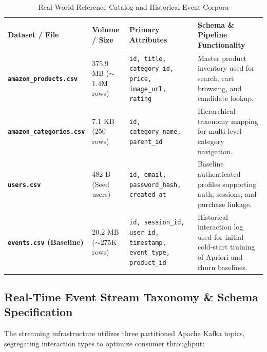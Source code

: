 \documentclass[11pt,a4paper]{article}
\begin{document}
\begin{table}[h]
\centering
\small
\begin{tabularx}{\textwidth}{@{}>{\bfseries}p{3.6cm}p{2.6cm}p{4.2cm}X@{}}
\toprule
\color{DeepNavy}Dataset / File & \color{DeepNavy}Volume / Size & \color{DeepNavy}Primary Attributes & \color{DeepNavy}Schema \& Pipeline Functionality \\
\midrule
\texttt{amazon\_products.csv} & 375.9 MB ($\sim$1.4M rows) & \texttt{id, title, category\_id, price, image\_url, rating} & Master product inventory used for search, cart browsing, and candidate lookup. \\
\addlinespace
\texttt{amazon\_categories.csv} & 7.1 KB (250 rows) & \texttt{id, category\_name, parent\_id} & Hierarchical taxonomy mapping for multi-level category navigation. \\
\addlinespace
\texttt{users.csv} & 482 B (Seed users) & \texttt{id, email, password\_hash, created\_at} & Baseline authenticated profiles supporting auth, sessions, and purchase linkage. \\
\addlinespace
\texttt{events.csv} (Baseline) & 20.2 MB ($\sim$275K rows) & \texttt{id, session\_id, user\_id, timestamp, event\_type, product\_id} & Historical interaction log used for initial cold-start training of Apriori and churn baselines. \\
\bottomrule
\end{tabularx}
\caption{Real-World Reference Catalog and Historical Event Corpora}
\end{table}

\subsection{Real-Time Event Stream Taxonomy \& Schema Specification}
The streaming infrastructure utilizes three partitioned Apache Kafka topics, segregating interaction types to optimize consumer throughput:
\end{document}
